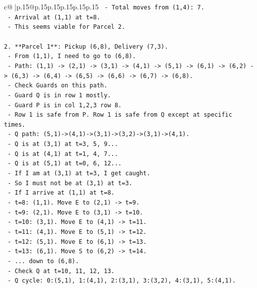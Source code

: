 \documentclass{article}
\begin{document}
{\begin{supertabular}{c@{$\;$}|p{.15\linewidth}@{}p{.15\linewidth}p{.15\linewidth}p{.15\linewidth}p{.15\linewidth}p{.15\linewidth}}
{{{\texttt{      {-} Total moves from (1,4): 7.} \\
\texttt{      {-} Arrival at (1,1) at t=8.} \\
\texttt{      {-} This seems viable for Parcel 2.} \\
\\ 
\texttt{2.  **Parcel 1**: Pickup (6,8), Delivery (7,3).} \\
\texttt{    {-} From (1,1), I need to go to (6,8).} \\
\texttt{    {-} Path: (1,1) {-}> (2,1) {-}> (3,1) {-}> (4,1) {-}> (5,1) {-}> (6,1) {-}> (6,2) {-}> (6,3) {-}> (6,4) {-}> (6,5) {-}> (6,6) {-}> (6,7) {-}> (6,8).} \\
\texttt{    {-} Check Guards on this path.} \\
\texttt{    {-} Guard Q is in row 1 mostly.} \\
\texttt{    {-} Guard P is in col 1,2,3 row 8.} \\
\texttt{    {-} Row 1 is safe from P. Row 1 is safe from Q except at specific times.} \\
\texttt{    {-} Q path: (5,1){-}>(4,1){-}>(3,1){-}>(3,2){-}>(3,1){-}>(4,1).} \\
\texttt{    {-} Q is at (3,1) at t=3, 5, 9...} \\
\texttt{    {-} Q is at (4,1) at t=1, 4, 7...} \\
\texttt{    {-} Q is at (5,1) at t=0, 6, 12...} \\
\texttt{    {-} If I am at (3,1) at t=3, I get caught.} \\
\texttt{    {-} So I must not be at (3,1) at t=3.} \\
\texttt{    {-} If I arrive at (1,1) at t=8.} \\
\texttt{    {-} t=8: (1,1). Move E to (2,1) {-}> t=9.} \\
\texttt{    {-} t=9: (2,1). Move E to (3,1) {-}> t=10.} \\
\texttt{    {-} t=10: (3,1). Move E to (4,1) {-}> t=11.} \\
\texttt{    {-} t=11: (4,1). Move E to (5,1) {-}> t=12.} \\
\texttt{    {-} t=12: (5,1). Move E to (6,1) {-}> t=13.} \\
\texttt{    {-} t=13: (6,1). Move S to (6,2) {-}> t=14.} \\
\texttt{    {-} ... down to (6,8).} \\
\texttt{    {-} Check Q at t=10, 11, 12, 13.} \\
\texttt{    {-} Q cycle: 0:(5,1), 1:(4,1), 2:(3,1), 3:(3,2), 4:(3,1), 5:(4,1).} \\
}}}
\end{supertabular}}
\end{document}
